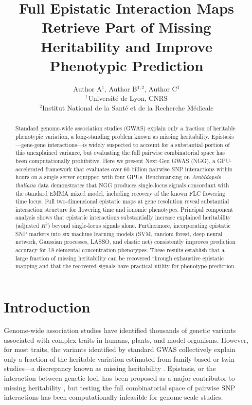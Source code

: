 \documentclass[11pt]{article}
\title{Full Epistatic Interaction Maps Retrieve Part of Missing Heritability and Improve Phenotypic Prediction}
\author{Author A$^{1}$, Author B$^{1,2}$, Author C$^{1}$ \\
\small $^{1}$Universit\'{e} de Lyon, CNRS \\
\small $^{2}$Institut National de la Sant\'{e} et de la Recherche M\'{e}dicale}
\date{}
\begin{document}
\maketitle

\begin{abstract}
Standard genome-wide association studies (GWAS) explain only a fraction of heritable phenotypic variation, a long-standing problem known as missing heritability. Epistasis---gene-gene interactions---is widely suspected to account for a substantial portion of this unexplained variance, but evaluating the full pairwise combinatorial space has been computationally prohibitive. Here we present Next-Gen GWAS (NGG), a GPU-accelerated framework that evaluates over 60 billion pairwise SNP interactions within hours on a single server equipped with four GPUs. Benchmarking on \textit{Arabidopsis thaliana} data demonstrates that NGG produces single-locus signals concordant with the standard EMMA mixed model, including recovery of the known FLC flowering time locus. Full two-dimensional epistatic maps at gene resolution reveal substantial interaction structure for flowering time and ionomic phenotypes. Principal component analysis shows that epistatic interactions substantially increase explained heritability (adjusted $R^2$) beyond single-locus signals alone. Furthermore, incorporating epistatic SNP markers into six machine learning models (SVM, random forest, deep neural network, Gaussian processes, LASSO, and elastic net) consistently improves prediction accuracy for 18 elemental concentration phenotypes. These results establish that a large fraction of missing heritability can be recovered through exhaustive epistatic mapping and that the recovered signals have practical utility for phenotype prediction.
\end{abstract}

\section{Introduction}

Genome-wide association studies have identified thousands of genetic variants associated with complex traits in humans, plants, and model organisms. However, for most traits, the variants identified by standard GWAS collectively explain only a fraction of the heritable variation estimated from family-based or twin studies---a discrepancy known as missing heritability \citep{manolio2009}. Epistasis, or the interaction between genetic loci, has been proposed as a major contributor to missing heritability \citep{zuk2012, marchini2005}, but testing the full combinatorial space of pairwise SNP interactions has been computationally infeasible for genome-scale studies.
\end{document}
